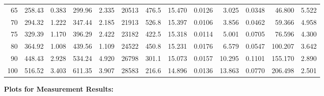 \documentclass[10pt]{article}
\begin{document}
{\begin{tabular}{|r|rr|rr|rr|rr|rr|r|r|}
       65 &       258.43 &        0.383 &       299.96 &        2.335 &        20513 &        476.5 &       15.470 &       0.0126 &        3.025 &       0.0348 &       46.800 &        5.522 \\
       70 &       294.32 &        1.222 &       347.44 &        2.185 &        21913 &        526.8 &       15.397 &       0.0106 &        3.856 &       0.0462 &       59.366 &        4.958 \\
       75 &       329.39 &        1.170 &       396.29 &        2.422 &        23182 &        422.5 &       15.318 &       0.0114 &        5.001 &       0.0705 &       76.596 &        4.300 \\
       80 &       364.92 &        1.008 &       439.56 &        1.109 &        24522 &        450.8 &       15.231 &       0.0176 &        6.579 &       0.0547 &      100.207 &        3.642 \\
       90 &       448.43 &        2.928 &       534.24 &        4.920 &        26798 &        301.1 &       15.073 &       0.0157 &       10.295 &       0.1101 &      155.170 &        2.890 \\
      100 &       516.52 &        3.403 &       611.35 &        3.907 &        28583 &        216.6 &       14.896 &       0.0136 &       13.863 &       0.0770 &      206.498 &        2.501 \\
\hline
\end{tabular}
}

\vspace{3mm}






\pagebreak
\noindent
{\large \bf Plots for Measurement Results:}
\vspace{5mm}
\end{document}
